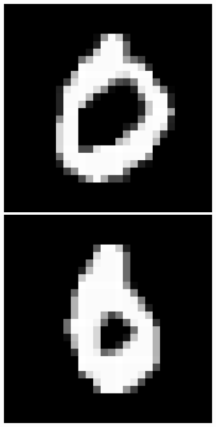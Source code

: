         \begin{figure}
        \centering
        \begin{minipage}{0.2\textwidth}
            \centering
            \includegraphics[width=0.95\linewidth]{c3_figures/samples/original_0.png}
        \end{minipage}
        \begin{minipage}{0.2\textwidth}
            \centering
            \includegraphics[width=0.95\linewidth]{c3_figures/samples/8409_0.png}

\end{minipage}
\end{figure}
